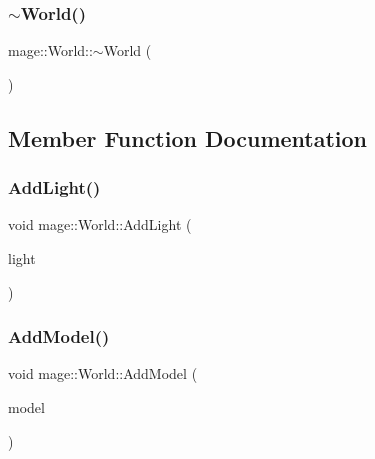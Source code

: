\hypertarget{classmage_1_1_world_a8f594ba33a69c4142d599e548337bbcf}{}\label{classmage_1_1_world_a8f594ba33a69c4142d599e548337bbcf} 
\subsubsection{\texorpdfstring{$\sim$\+World()}{~World()}}
{\footnotesize\ttfamily mage\+::\+World\+::$\sim$\+World (\begin{DoxyParamCaption}{ }\end{DoxyParamCaption})}



\subsection{Member Function Documentation}
\hypertarget{classmage_1_1_world_a6dc45363e8740918b85788b8280ef403}{}\label{classmage_1_1_world_a6dc45363e8740918b85788b8280ef403} 
\subsubsection{\texorpdfstring{Add\+Light()}{AddLight()}}
{\footnotesize\ttfamily void mage\+::\+World\+::\+Add\+Light (\begin{DoxyParamCaption}\item[{\hyperlink{namespacemage_a1e01ae66713838a7a67d30e44c67703e}{Shared\+Ptr}$<$ \hyperlink{classmage_1_1_light}{Light} $>$}]{light }\end{DoxyParamCaption})}

\hypertarget{classmage_1_1_world_a4b7287a11ff316b029ec7727ed0d076d}{}\label{classmage_1_1_world_a4b7287a11ff316b029ec7727ed0d076d} 
\subsubsection{\texorpdfstring{Add\+Model()}{AddModel()}}
{\footnotesize\ttfamily void mage\+::\+World\+::\+Add\+Model (\begin{DoxyParamCaption}\item[{\hyperlink{namespacemage_a1e01ae66713838a7a67d30e44c67703e}{Shared\+Ptr}$<$ \hyperlink{classmage_1_1_model}{Model} $>$}]{model }\end{DoxyParamCaption})}

